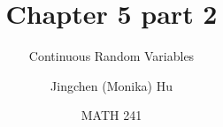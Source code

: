 \documentclass[slidestop,compress,mathserif]{beamer}
\title[Chapter 5 part 2]{Chapter 5 part 2}
\subtitle{Continuous Random Variables}
\author[Jingchen (Monika) Hu] %
{Jingchen (Monika) Hu}
\institute[Vassar] %
{Vassar College}
\date[MATH 241] %
{MATH 241}
\begin{document}


\begin{frame}%
\titlepage
\end{frame}


\end{document}
